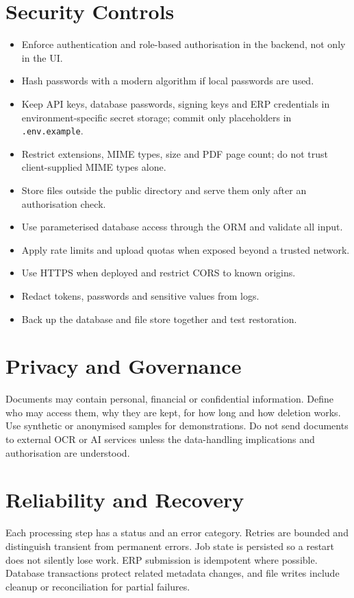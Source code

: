 \section{Security Controls}
\begin{itemize}
\item Enforce authentication and role-based authorisation in the backend, not only in the UI.
\item Hash passwords with a modern algorithm if local passwords are used.
\item Keep API keys, database passwords, signing keys and ERP credentials in environment-specific secret storage; commit only placeholders in \texttt{.env.example}.
\item Restrict extensions, MIME types, size and PDF page count; do not trust client-supplied MIME types alone.
\item Store files outside the public directory and serve them only after an authorisation check.
\item Use parameterised database access through the ORM and validate all input.
\item Apply rate limits and upload quotas when exposed beyond a trusted network.
\item Use HTTPS when deployed and restrict CORS to known origins.
\item Redact tokens, passwords and sensitive values from logs.
\item Back up the database and file store together and test restoration.
\end{itemize}

\section{Privacy and Governance}
Documents may contain personal, financial or confidential information. Define who may access them, why they are kept, for how long and how deletion works. Use synthetic or anonymised samples for demonstrations. Do not send documents to external OCR or AI services unless the data-handling implications and authorisation are understood.

\section{Reliability and Recovery}
Each processing step has a status and an error category. Retries are bounded and distinguish transient from permanent errors. Job state is persisted so a restart does not silently lose work. ERP submission is idempotent where possible. Database transactions protect related metadata changes, and file writes include cleanup or reconciliation for partial failures.


